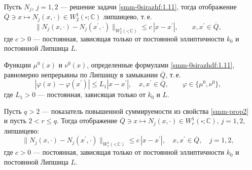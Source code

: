 \begin{property}\label{smm-prop3}
{Пусть $N_j$, $j=1,2$ --- решение задачи \eqref{smm-0sirazhf:1.11}, тогда отображение
	$\overline{Q}\ni x \mapsto  N_j(x,\cdot)\in W_2^1(\square;\mathbb{C})$ липшицево, т.\,е.
	\begin{equation}\label{smm-0sirazhdf:1.16}
		\|N_j(x,\cdot)-N_j(x^\prime,\cdot)\|_{W_2^1(\square;\mathbb{C})}\leqslant c\,|x-x^\prime|,
		\qquad x,x^\prime\in\overline{Q},
	\end{equation}
	где $c>0$ --- постоянная, зависящая только от постоянной эллиптичности $k_0$
	и постоянной Липшица $L$.}
\end{property}

\begin{corollary}
{Функции $\mu^0 (x)$ и $\nu^0(x)$, определенные формулами \eqref{smm-0sirazhdf:1.11},
	равномерно непрерывны по Липшицу в замыкании $\overline{Q}$, т.\,е.
	\begin{equation*}
		|\varphi(x)-\varphi(x^\prime)|\leqslant L_1|x-x^\prime|,\quad x,x^\prime\in\overline{Q},\qquad
		\varphi\in\{\mu^0,\nu^0\},
	\end{equation*}
	где  $L_1>0$ --- постоянная, зависящая только от $k_0$ и $L$.}
\end{corollary}

\begin{property}\label{smm-prop4}
{Пусть $q>2$ --- показатель повышенной суммируемости из
	свойства \ref{smm-prop2}  и пусть $2<r\leqslant q$. Тогда отображение $\overline{Q}\ni x \mapsto  N_j(x,\cdot)\in W_r^1(\square;\mathbb{C})$, $j=1,2$,
	липшицево:
	\begin{equation}\label{smm-0sirazhdf:21}
		\|N_j(x,\cdot)-N_j(x^\prime,\cdot)\|_{W_r^1(\square;\mathbb{C})}\leqslant c\,|x-x^\prime|,\quad x,x^\prime\in\overline{Q},\quad
		j=1,2,
	\end{equation}
	где $c>0$ --- постоянная, зависящая только от постоянной эллиптичности $k_0$ и постоянной Липшица $L$}.
\end{property}

